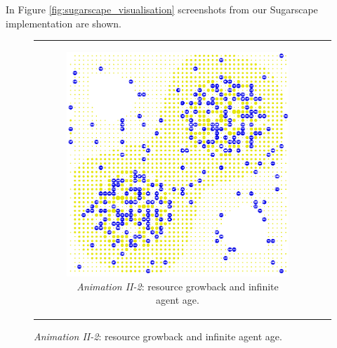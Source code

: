 In Figure \ref{fig:sugarscape_visualisation} screenshots from our Sugarscape implementation are shown.


\begin{figure}[H]
\begin{center}
	\begin{tabular}{c c}
		\begin{subfigure}[b]{0.4\textwidth}
			\centering
			\includegraphics[width=1\textwidth, angle=0]{./fig/background/abs/sugarscape_normal.png}
			\caption{\textit{Animation II-2}: resource growback and infinite agent age.}
			\label{fig:sugarscape_visualisation_normal}
		\end{subfigure}
		
		&
    	

\end{tabular}
\end{center}
\end{figure}
